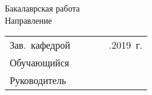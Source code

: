 \thispagestyle{empty}
\begin{center}
\thesisOrganization
\end{center}

%
\vspace{0pt plus1fill} %
\begin{center}
{\thesisFacultyTitle} \\
{\thesisCafedrTitle} \\
\end{center}
%
\vspace{0pt plus8fill} %
\begin{center}
\textbf { %
\thesisTitle}

{%
\vspace{0pt plus1fill}
Бакалаврская работа \\
Направление \thesisSpecialtyNumber \space
\thesisSpecialtyTitle \\
\thesisProfile  
}

\vspace{0pt plus4fill} %
\end{center}
%
\vspace{0pt plus12fill} %
\begin{flushright}
	\begin{tabular}{lclll}
		Зав.~кафедрой 	& \underline{\hspace{2.4cm}} 	& \genCafedraRegaliaShort 	& \genCafedraFIOShort 	& \underline{\hspace{0.7cm}}.\underline{\hspace{0.7cm}}2019~г.	\\
		Обучающийся 	& \underline{\hspace{2.4cm}} 	&   						& \thesisAuthorShort 	& 						\\
		Руководитель 	& \underline{\hspace{2.4cm}} 	& \supervisorRegaliaShort	& \supervisorFioShort 	& 						\\
	\end{tabular}
	
\end{flushright}
%
\vspace{0pt plus8fill} %
{\centering\thesisCity~\thesisYear\par}
